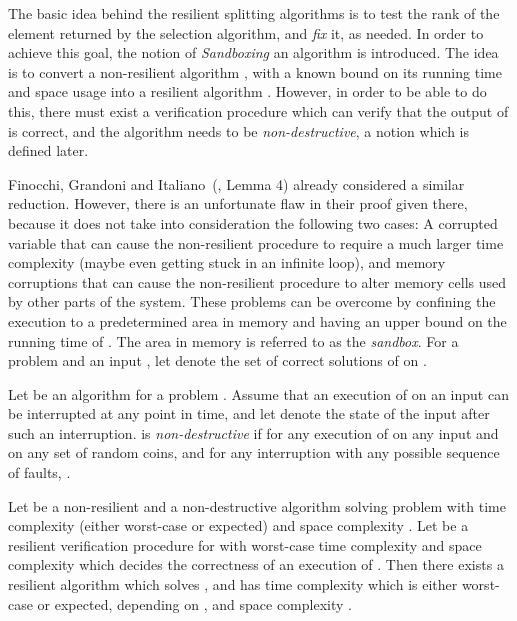 \documentclass{llncs}
\begin{document}
The basic idea behind the resilient splitting algorithms is to test the rank of the element returned by the selection algorithm, and \emph{fix} it, as needed. In order to achieve this goal, the notion of \emph{Sandboxing} an algorithm is introduced. The idea is to convert a non-resilient algorithm , with a known bound on its running time and space usage into a resilient algorithm . However, in order to be able to do this, there must exist a verification procedure which can verify that the output of  is correct, and the algorithm  needs to be \emph{non-destructive}, a notion which is defined later.

Finocchi, Grandoni and Italiano~(\cite{resilient_dictionaries}, Lemma 4) already considered a similar reduction. However, there is an unfortunate flaw in their proof given there, because it does not take into consideration the following two cases: A corrupted variable that can cause the non-resilient procedure to require a much larger time complexity (maybe even getting stuck in an infinite loop), and memory corruptions that can cause the non-resilient procedure to alter memory cells used by other parts of the system. These problems can be overcome by confining the execution to a predetermined area in memory and having an upper bound on the running time of . The area in memory is referred to as the \emph{sandbox}. For a problem  and an input , let  denote the set of correct solutions of  on .

\begin{definition}
Let  be an algorithm for a problem . Assume that an execution of  on an input  can be interrupted at any point in time, and let  denote the state of the input after such an interruption.  is \emph{non-destructive} if for any execution of  on any input  and on any set of random coins, and for any interruption with any possible sequence of faults, .
\end{definition}

\begin{lemma}
\label{lem:sandbox_lemma}
Let  be a non-resilient and a non-destructive algorithm solving problem  with time complexity  (either worst-case or expected) and space complexity . Let  be a resilient verification procedure for  with worst-case time complexity  and space complexity  which decides the correctness of an execution of .
Then there exists a resilient algorithm  which solves , and has time complexity  which is either worst-case or expected, depending on , and space complexity .
\end{lemma}
\end{document}
